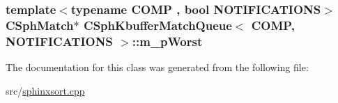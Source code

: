 \hypertarget{classCSphKbufferMatchQueue_a68c72dc2e73d0e7925cc26b14072513c}{
\subsubsection[{m\-\_\-p\-Worst}]{\setlength{\rightskip}{0pt plus 5cm}template$<$typename C\-O\-M\-P , bool N\-O\-T\-I\-F\-I\-C\-A\-T\-I\-O\-N\-S$>$ {\bf C\-Sph\-Match}$\ast$ {\bf C\-Sph\-Kbuffer\-Match\-Queue}$<$ C\-O\-M\-P, N\-O\-T\-I\-F\-I\-C\-A\-T\-I\-O\-N\-S $>$\-::m\-\_\-p\-Worst\hspace{0.3cm}{\ttfamily [protected]}}}\label{classCSphKbufferMatchQueue_a68c72dc2e73d0e7925cc26b14072513c}


The documentation for this class was generated from the following file\-:\begin{DoxyCompactItemize}
\item 
src/\hyperlink{sphinxsort_8cpp}{sphinxsort.\-cpp}\end{DoxyCompactItemize}
